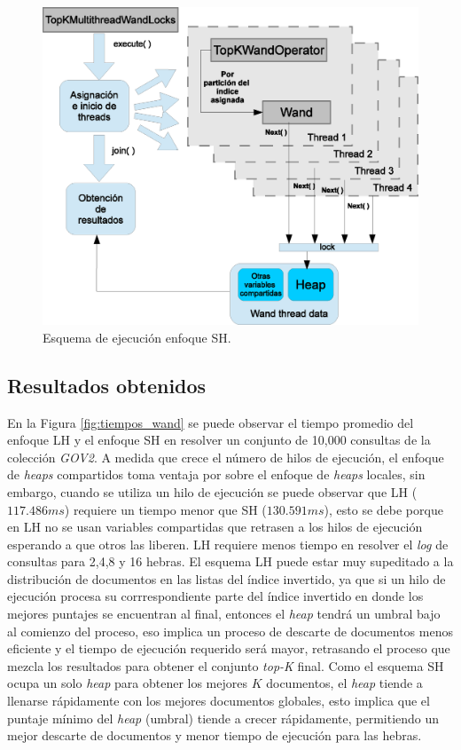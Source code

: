 \begin{figure}[tp]
\centering
\includegraphics[scale=.75]{images/ejecucion_topkmultithreadwandopCOMPARTIDO.eps}
\caption{Esquema de ejecución enfoque SH.}
\label{fig:esquema_ejecucion_wandsh}
\end{figure}


\subsection{Resultados obtenidos}
\label{evaluacionexperimental:resultadosObtenidos}
En la Figura \ref{fig:tiempos_wand} se puede observar el tiempo promedio del enfoque LH y el enfoque SH en resolver un conjunto de 10,000 consultas de la colección \textit{GOV2}. A medida que crece el número de hilos de ejecución, el enfoque de \textit{heaps} compartidos toma ventaja por sobre el enfoque de \textit{heaps} locales, sin embargo, cuando se utiliza un hilo de ejecución se puede observar que LH ($117.486 ms$) requiere un tiempo menor que SH ($130.591 ms$), esto se debe porque en LH no se usan variables compartidas que retrasen a los hilos de ejecución esperando a que otros las liberen. LH requiere menos tiempo en resolver el \textit{log} de consultas para 2,4,8 y 16 hebras. 
El esquema LH puede estar muy supeditado a la distribución de documentos en las listas del índice invertido, ya que si un hilo de ejecución procesa su corrrespondiente parte del índice invertido en donde los mejores puntajes se encuentran al final, entonces el \textit{heap} tendrá un umbral bajo al comienzo del proceso, eso implica un proceso de descarte de documentos menos eficiente y el tiempo de ejecución requerido será mayor, retrasando el proceso que mezcla los resultados para obtener el conjunto \textit{top-K} final. 
Como el esquema SH ocupa un solo \textit{heap} para obtener los mejores $K$ documentos, el \textit{heap} tiende a llenarse rápidamente con los mejores documentos globales, esto implica que el puntaje mínimo del \textit{heap} (umbral) tiende a crecer rápidamente, permitiendo un mejor descarte de documentos y menor tiempo de ejecución para las hebras. 

